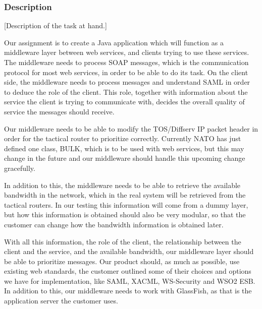 \documentclass[12pt]{article}
\begin{document}
        \subsubsection{Description}\label{taskdesc} 
        [Description of the task at hand.]
        
        Our assignment is to create a Java application which will function as a middleware layer between web services, and clients trying to use these services. The middleware needs to process SOAP messages, which is the communication protocol for most web services, in order to be able to do its task. On the client side, the middleware needs to process messages and understand SAML in order to deduce the role of the client. This role, together with information about the service the client is trying to communicate with, decides the overall quality of service the messages should receive. 

        Our middleware needs to be able to modify the TOS/Diffserv IP packet header in order for the tactical router to prioritize correctly. Currently NATO has just defined one class, BULK, which is to be used with web services, but this may change in the future and our middleware should handle this upcoming change gracefully.

        In addition to this, the middleware needs to be able to retrieve the available bandwidth in the network, which in the real system will be retrieved from the tactical routers. In our testing this information will come from a dummy layer, but how this information is obtained should also be very modular, so that the customer can change how the bandwidth information is obtained later.

        With all this information, the role of the client, the relationship between the client and the service, and the available bandwidth, our middleware layer should be able to prioritize messages. Our product should, as much as possible, use existing web standards, the customer outlined some of their choices and options we have for implementation, like SAML, XACML, WS-Security and WSO2 ESB. In addition to this, our middleware needs to work with GlassFish, as that is the application server the customer uses.
\end{document}
